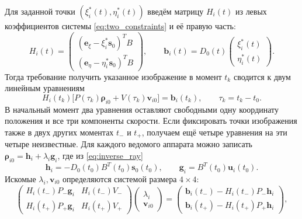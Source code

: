 \documentclass[a4paper,12pt]{article}
\begin{document}
Для заданной точки $(\xi_i^*(t),\eta_i^*(t))$ введём матрицу $H_i(t)$ из левых коэффициентов системы \eqref{eq:two_constraints} и её правую часть:
\begin{equation}
    H_i(t)=
    \begin{pmatrix}
       (\mathbf e_\xi-\xi_i^*\mathbf s_0)^TB\\
       (\mathbf e_\eta-\eta_i^*\mathbf s_0)^TB
    \end{pmatrix},
    \qquad
    \mathbf b_i(t)=D_0(t)\begin{pmatrix}\xi_i^*(t)\\\eta_i^*(t)\end{pmatrix}.
    \label{eq:projection_matrix}
\end{equation}
Тогда требование получить указанное изображение в момент $t_k$ сводится к двум линейным уравнениям
\begin{equation}
    H_i(t_k)\bigl[P(\tau_k)\boldsymbol\rho_{i0}
                    +V(\tau_k)\mathbf v_{i0}\bigr]=\mathbf b_i(t_k),
    \qquad \tau_k=t_k-t_0.
    \label{eq:projection_at_epoch}
\end{equation}
В начальный момент два уравнения оставляют свободными одну координату положения и все три компоненты скорости. Если фиксировать точки изображения также в двух других моментах $t_-$ и $t_+$, получаем ещё четыре уравнения на эти четыре неизвестные. Для каждого ведомого аппарата можно записать $\boldsymbol\rho_{i0}=\mathbf h_i+\lambda_i\mathbf g_i$, где из \eqref{eq:inverse_ray}
\begin{equation}
    \mathbf h_i=-D_0(t_0)B^T(t_0)\mathbf s_0(t_0),
    \qquad
    \mathbf g_i=B^T(t_0)\mathbf u_i(t_0).
\end{equation}
Искомые $\lambda_i,\mathbf v_{i0}$ определяются системой размера $4\times4$:
\begin{equation}
    \begin{pmatrix}
      H_i(t_-)P_-\mathbf g_i&H_i(t_-)V_-\\
      H_i(t_+)P_+\mathbf g_i&H_i(t_+)V_+
    \end{pmatrix}
    \begin{pmatrix}\lambda_i\\\mathbf v_{i0}\end{pmatrix}
    =
    \begin{pmatrix}
      \mathbf b_i(t_-)-H_i(t_-)P_-\mathbf h_i\\
      \mathbf b_i(t_+)-H_i(t_+)P_+\mathbf h_i
    \end{pmatrix},
    \label{eq:four_by_four}
\end{equation}
\end{document}
